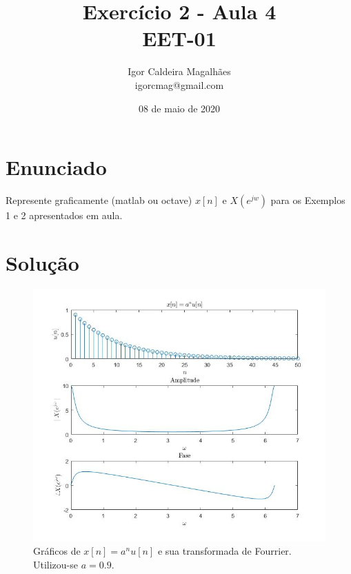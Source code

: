 \documentclass[a4paper, 12pt]{article}
\title{Exercício 2 - Aula 4 \\ EET-01}
\author{
  Igor Caldeira Magalhães\\igorcmag@gmail.com
}
\date{08 de maio de 2020}
\begin{document}
\maketitle
\section{Enunciado}

Represente graficamente (matlab ou octave) $x[n]$ e $X(e^{jw})$ para os Exemplos 1 e 2 apresentados em aula.


\section{Solução}



\begin{figure}[H]
	\centering
	\includegraphics[scale=0.7]{img2.jpg} 
	\caption{Gráficos de $x[n]=a^nu[n]$ e sua transformada de Fourrier. Utilizou-se $a=0.9$.}
	\label{fig:1a}
\end{figure}
\end{document}
